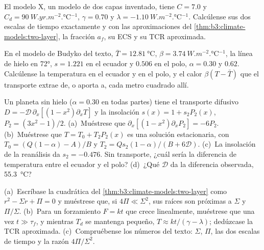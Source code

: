 \begin{exercise}[$\star\star$]\label{exo:b3:climate-models:8}
El modelo X, un modelo de dos capas inventado, tiene $C = 7.0$ y $C_d =
\qty{90}{W.yr.m^{-2}.\celsius^{-1}}$, $\gamma = 0.70$ y $\lambda =
\qty{-1.10}{W.m^{-2}.\celsius^{-1}}$. Calcúlense sus dos escalas de tiempo exactamente
y con las aproximaciones del \cref{thm:b3:climate-models:two-layer}, la
fracción $a_f$, su ECS y su TCR aproximada.
\end{exercise}

\begin{exercise}[$\star\star$]\label{exo:b3:climate-models:9}
En el modelo de Budyko del texto, $\bar T = \qty{12.81}{\celsius}$, $\beta =
\qty{3.74}{W.m^{-2}.\celsius^{-1}}$, la línea de hielo en \ang{72}, $s = 1.221$
en el ecuador y $0.506$ en el polo, $\alpha = 0.30$ y $0.62$.
Calcúlense la temperatura en el ecuador y en el polo, y el calor
$\beta(T - \bar T)$ que el transporte extrae de, o aporta a, cada
metro cuadrado allí.
\end{exercise}

\begin{exercise}[$\star\star\star$]\label{exo:b3:climate-models:10}
Un planeta sin hielo ($\alpha = 0.30$ en todas partes) tiene el transporte difusivo
$D = -\mathcal D\,\partial_x[(1 - x^2)\partial_xT]$ y la
insolación $s(x) = 1 + s_2P_2(x)$, $P_2 = (3x^2 - 1)/2$. (a)~Muéstrese que
$\partial_x[(1 - x^2)\partial_xP_2] = -6P_2$. (b)~Muéstrese que $T = T_0 +
T_2P_2(x)$ es una solución estacionaria, con $T_0 = (Q(1 - \alpha) - A)/B$ y
$T_2 = Qs_2(1 - \alpha)/(B + 6\mathcal D)$. (c)~La insolación de la
reanálisis da $s_2 = \num{-0.476}$. Sin transporte, ¿cuál sería la
diferencia de temperatura entre el ecuador y el polo? (d)~¿Qué $\mathcal D$ da
la diferencia observada, \qty{55.3}{\celsius}?
\end{exercise}

\begin{exercise}[$\star\star\star$]\label{exo:b3:climate-models:11}
(a)~Escríbase la cuadrática del \cref{thm:b3:climate-models:two-layer} como $r^2 -
\Sigma r + \Pi = 0$ y muéstrese que, si $4\Pi \ll \Sigma^2$, sus raíces son
próximas a $\Sigma$ y $\Pi/\Sigma$. (b)~Para un forzamiento $F = kt$ que crece
linealmente, muéstrese que una vez $t \gg \tau_f$, y mientras $T_d$ se mantenga pequeño,
$T \approx kt/(\gamma - \lambda)$; dedúzcase la TCR aproximada. (c)~Compruébense
los números del texto: $\Sigma$, $\Pi$, las dos escalas de tiempo y la
razón $4\Pi/\Sigma^2$.
\end{exercise}

